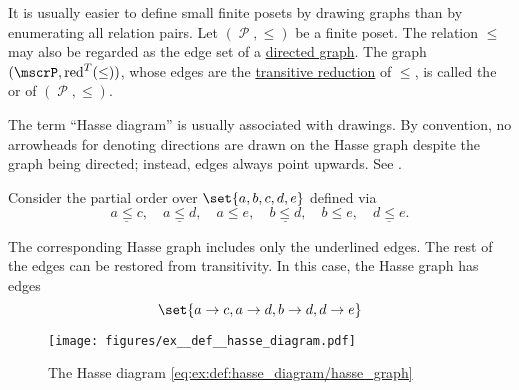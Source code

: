 \begin{definition}\label{def:hasse_diagram}
  It is usually easier to define small finite posets by drawing graphs than by enumerating all relation pairs. Let \( (\mscrP, \leq) \) be a finite poset. The relation \( \leq \) may also be regarded as the edge set of a \hyperref[def:directed_graph]{directed graph}. The graph \( (\mscrP, \red^T(\leq)) \), whose edges are the \hyperref[def:derived_relations/transitive]{transitive reduction} of \( \leq \), is called the  or  of \( (\mscrP, \leq) \).

  The term \enquote{Hasse diagram} is usually associated with drawings. By convention, no arrowheads for denoting directions are drawn on the Hasse graph despite the graph being directed; instead, edges always point upwards. See .
\end{definition}

\begin{example}\label{ex:def:hasse_diagram}
  Consider the partial order over \( \set{ a, b, c, d, e } \) defined via
  \begin{equation}\label{eq:ex:def:hasse_diagram/poset}
    \underline{a \leq c},\quad \underline{a \leq d},\quad a \leq e,\quad \underline{b \leq d},\quad b \leq e,\quad \underline{d \leq e}.
  \end{equation}

  The corresponding Hasse graph includes only the underlined edges. The rest of the edges can be restored from transitivity. In this case, the Hasse graph has edges
  \begin{equation}\label{eq:ex:def:hasse_diagram/hasse_graph}
    \set{ a \to c, a \to d, b \to d, d \to e }
  \end{equation}

  \begin{figure}
    \centering
    \texttt{[image: figures/ex\_\_def\_\_hasse\_diagram.pdf]}
    \caption{The Hasse diagram \eqref{eq:ex:def:hasse_diagram/hasse_graph}}
    \label{fig:ex:def:hasse_diagram}
  \end{figure}
\end{example}

